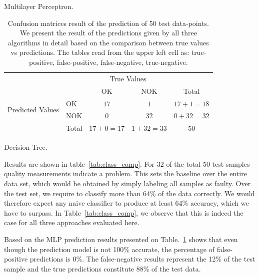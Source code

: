 \documentclass[5p,times,procedia]{elsarticle}
\begin{document}
\begin{table}
\begin{subtable}[h]{0.3\textwidth}
              \caption{Multilayer Perceptron.}
              \label{tab:MPL_conf_matrix}
       \end{subtable}
       \begin{subtable}[h]{0.3\textwidth}
              \centering
              \begin{adjustbox}{width=1.6\textwidth}
              \begin{tabular}{l|l|c|c|c}
                     \multicolumn{2}{c}{}&\multicolumn{2}{c}{True Values}&\\
                     \cline{3-4}
                     \multicolumn{2}{c|}{}& OK & NOK &\multicolumn{1}{c}{Total}\\
                     \cline{2-4}
                     \multirow{2}{*}{Predicted Values}& OK & $17$ & $1$ & $17+1 = 18$\\
                     \cline{2-4}
                     & NOK & $0$ & $32$ & $0+32 = 32$\\
                     \cline{2-4}
                     \multicolumn{1}{c}{} & \multicolumn{1}{c}{Total} & \multicolumn{1}{c}{$17+0 = 17$} & \multicolumn{    1}{c}{$1+32 = 33$} & \multicolumn{1}{c}{$50$}\\
              \end{tabular}
              \end{adjustbox}
              \caption{Decision Tree.}
              \label{tab:Tree_conf_matrix}
       \end{subtable}
       \caption{Confusion matrices result of the prediction of 50 test data-points. We present the result of the predictions given by all three algorithms in detail based on the comparison between true values vs predictions. The tables read from the upper left cell as: true-positive, false-positive, false-negative, true-negative.}
       \label{tab:Confusion_matrix}
\end{table}


Results are shown in table~\ref{tab:class_comp}. For 32 of the total 50 test samples
quality measurements indicate a problem. This sets the 
baseline over the entire data set, which would be obtained by simply labeling all samples
as faulty. Over the test set, we require to classify more than 64\% of the data correctly.
We would therefore expect any naive classifier to produce at least 64\% accuracy, which we have to surpass. In Table~\ref{tab:class_comp}, we observe that this is indeed the case for all three approaches evaluated here.

Based on the MLP prediction results presented on Table.~\ref{tab:Confusion_matrix} shows that even though the prediction model is not 100\% accurate, the percentage of false-positive predictions is 0\%. The false-negative results represent the 12\% of the test sample and the true predictions constitute 88\% of the test data.
\end{document}
